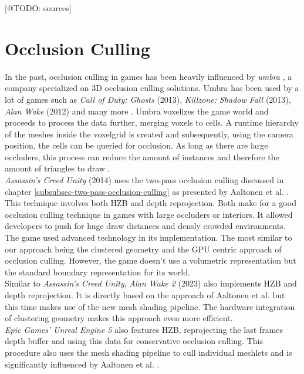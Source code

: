 [@TODO: sources]


\section{Occlusion Culling}

In the past, occlusion culling in games has been heavily influenced by \emph{umbra} \cite{Umbra2024}, a company 
specialized on 3D occlusion culling solutions. Umbra has been used by a lot of games such as \emph{Call of Duty: Ghosts} 
(2013), \emph{Killzone: Shadow Fall} (2013), \emph{Alan Wake} (2012) and many more 
\cite{UmbraWiki,CallOfDutyGhostsCredits, KillzoneUmbra,AlanWakeUmbra}. Umbra voxelizes the game world and proceeds 
to process the data further, merging voxels to cells. A runtime hierarchy of the meshes inside the voxelgrid is created 
and subsequently, using the camera position, the cells can be queried for occlusion. As long as there are large 
occluders, this process can reduce the amount of instances and therefore the amount of triangles to draw 
\cite{Bonet2021}. \\

\noindent
\emph{Assassin's Creed Unity} (2014) uses the two-pass occlusion culling discussed in chapter 
\ref{subsubsec-two-pass-occlusion-culling} as presented by Aaltonen et al. \cite{Aaltonen2015}. This technique 
involves both \ac{HZB} and depth reprojection. Both make for a good occlusion culling technique in games with large 
occluders or interiors. It allowed developers to push for huge draw distances and densly crowded environments. The 
game used advanced technology in its implementation. The most similar to our approach being the clustered geometry 
and the \ac{GPU} centric approach of occlusion culling. However, the game doesn't use a volumetric representation but 
the standard boundary representation for its world. \\

\noindent
Similar to \emph{Assassin's Creed Unity}, \emph{Alan Wake 2} (2023) also implements \ac{HZB} and depth reprojection. 
It is directly based on the approach of Aaltonen et al. \cite{Aaltonen2015} but this time makes use of the new mesh 
shading pipeline. The hardware integration of clustering geometry makes this approach even more efficient. \\

\noindent
\emph{Epic Games'} \emph{Unreal Engine 5} also features \ac{HZB}, reprojecting the last frames depth buffer and using 
this data for conservative occlusion culling. This procedure also uses the mesh shading pipeline to cull individual 
meshlets and is significantly influenced by Aaltonen et al. \cite{Aaltonen2015, Karis2021}. 

